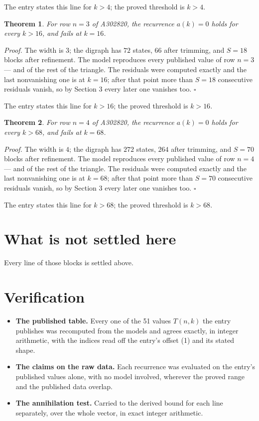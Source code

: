 \documentclass[11pt]{article}
\newtheorem{theorem}{Theorem}
\theoremstyle{definition}
\begin{document}
The entry states this line for $k > 4$; the proved threshold is $k > 4$.

\begin{theorem} For row $n = 3$ of A302820, the recurrence $a(k) = 0$ holds for every $k > 16$, and fails at $k = 16$.\end{theorem}

{\itshape Proof.} The width is $3$; the digraph has $72$ states, $66$ after trimming, and $S = 18$ blocks after refinement. The model reproduces every published value of row $n = 3$ --- and of the rest of the triangle. The residuals were computed exactly and the last nonvanishing one is at $k = 16$; after that point more than $S = 18$ consecutive residuals vanish, so by Section 3 every later one vanishes too. $\square$

The entry states this line for $k > 16$; the proved threshold is $k > 16$.

\begin{theorem} For row $n = 4$ of A302820, the recurrence $a(k) = 0$ holds for every $k > 68$, and fails at $k = 68$.\end{theorem}

{\itshape Proof.} The width is $4$; the digraph has $272$ states, $264$ after trimming, and $S = 70$ blocks after refinement. The model reproduces every published value of row $n = 4$ --- and of the rest of the triangle. The residuals were computed exactly and the last nonvanishing one is at $k = 68$; after that point more than $S = 70$ consecutive residuals vanish, so by Section 3 every later one vanishes too. $\square$

The entry states this line for $k > 68$; the proved threshold is $k > 68$.

\section{What is not settled here}

Every line of those blocks is settled above.

\section{Verification}

\begin{itemize}

\item {\bfseries The published table.} Every one of the 51 values $T(n,k)$ the entry publishes was recomputed from the models and agrees exactly, in integer arithmetic, with the indices read off the entry's offset (1) and its stated shape.

\item {\bfseries The claims on the raw data.} Each recurrence was evaluated on the entry's published values alone, with no model involved, wherever the proved range and the published data overlap.

\item {\bfseries The annihilation test.} Carried to the derived bound for each line separately, over the whole vector, in exact integer arithmetic.

\end{itemize}
\end{document}
